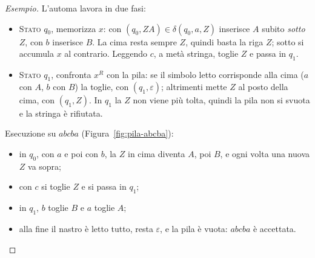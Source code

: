 \documentclass[a4paper, 11pt, oneside]{book}
\theoremstyle{formale}
\newenvironment{esempio}
    {\begin{proof}[\textit{Esempio}]\renewcommand{\qedsymbol}{$\diamond$}}
    {\end{proof}}
\begin{document}
\begin{esempio}
        L'automa lavora in due fasi:
        \begin{itemize}
            \item \textsc{Stato $q_0$}, memorizza $x$: con $(q_0, ZA) \in
                \delta(q_0, a, Z)$ inserisce $A$ subito \emph{sotto} $Z$, con $b$
                inserisce $B$. La cima resta sempre $Z$, quindi basta la riga $Z$; sotto
                si accumula $x$ al contrario. Leggendo $c$, a met\`a stringa, toglie $Z$ e
                passa in $q_1$.
            \item \textsc{Stato $q_1$}, confronta $x^R$ con la pila: se il simbolo letto
                corrisponde alla cima ($a$ con $A$, $b$ con $B$) la toglie, con
                $(q_1, \varepsilon)$; altrimenti mette $Z$ al posto della cima, con
                $(q_1, Z)$. In $q_1$ la $Z$ non viene pi\`u tolta, quindi la pila non si
                svuota e la stringa \`e rifiutata.
        \end{itemize}
        Esecuzione su $abcba$ (Figura~\ref{fig:pila-abcba}):
        \begin{itemize}
            \item in $q_0$, con $a$ e poi con $b$, la $Z$ in cima diventa $A$, poi $B$, e
                ogni volta una nuova $Z$ va sopra;
            \item con $c$ si toglie $Z$ e si passa in $q_1$;
            \item in $q_1$, $b$ toglie $B$ e $a$ toglie $A$;
            \item alla fine il nastro \`e letto tutto, resta $\varepsilon$, e la pila \`e
                vuota: $abcba$ \`e accettata.
        \end{itemize}

        \begin{figure}[H]
            \centering
\end{figure}
\end{esempio}
\end{document}
